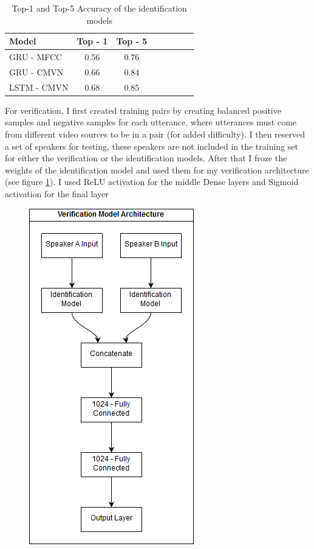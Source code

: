 \documentclass{article}
\begin{document}
\begin{table}[H]
    \centering
    \begin{tabular}{l*{6}{c}r}
        Model & Top - 1 & Top - 5\\
        \hline
        GRU - MFCC & 0.56 & 0.76  \\
        GRU - CMVN & 0.66 & 0.84  \\
        LSTM - CMVN & 0.68 & 0.85  \\
    \end{tabular}
    \caption{Top-1 and Top-5 Accuracy of the identification models}
    \label{tab:id_results}
\end{table}
For verification, I first created training pairs by creating balanced positive samples and negative samples for each utterance, where utterances must come from different video sources to be in a pair (for added difficulty). I then reserved a set of speakers for testing, these speakers are not included in the training set for either the verification or the identification models.
After that I froze the weights of the identification model and used them for my verification architecture (see figure \ref{fig:ver_arch}).
I used ReLU activation for the middle Dense layers and Sigmoid activation for the final layer

\begin{figure}[H]
    \centering
    \includegraphics[scale=.65]{images/verification_model.png}
    \caption{}
    \label{fig:ver_arch}
\end{figure}
\end{document}
